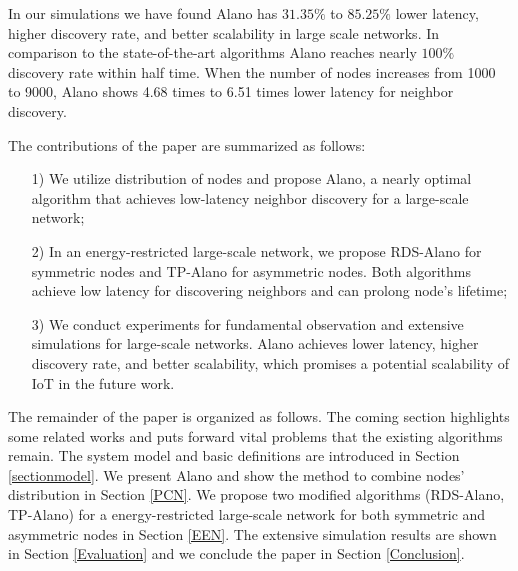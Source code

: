 In our simulations we have found Alano has $31.35\%$ to $ 85.25\%$ lower latency, higher discovery rate, and better scalability  in large scale networks. %
In comparison to the state-of-the-art algorithms \cite{you2011aloha, sun2014hello, chen2015heterogeneous, bakht2012searchlight}
Alano reaches nearly $100\%$ discovery rate within half time. 
When the number of nodes increases from 1000 to 9000, 
Alano shows 4.68 times to 6.51 times lower latency for neighbor discovery.


The contributions of the paper are summarized as follows:
\begin{itemize}
\item[1)] We utilize distribution  of nodes and propose Alano, a nearly optimal algorithm that achieves low-latency neighbor discovery for a large-scale network;
\item[2)] In an energy-restricted large-scale network, we propose RDS-Alano for symmetric nodes and TP-Alano for asymmetric nodes. Both algorithms achieve low latency for discovering neighbors and can prolong node's lifetime;
\item[3)] We conduct experiments for fundamental observation and extensive simulations for large-scale networks.  Alano achieves lower latency, higher discovery rate, and better scalability,
which promises a potential scalability of IoT in the future work.  %
\end{itemize}

The remainder of the paper is organized as follows. The coming section highlights some related works and puts forward vital problems that the existing algorithms remain. The system model and basic definitions are introduced in Section \ref{sectionmodel}. We present Alano and show the method to combine nodes' distribution in Section \ref{PCN}. We propose two modified algorithms (RDS-Alano, TP-Alano) for a energy-restricted large-scale network for both symmetric and asymmetric nodes in Section \ref{EEN}. The extensive simulation results are shown in Section \ref{Evaluation} and we conclude the paper in Section \ref{Conclusion}.




